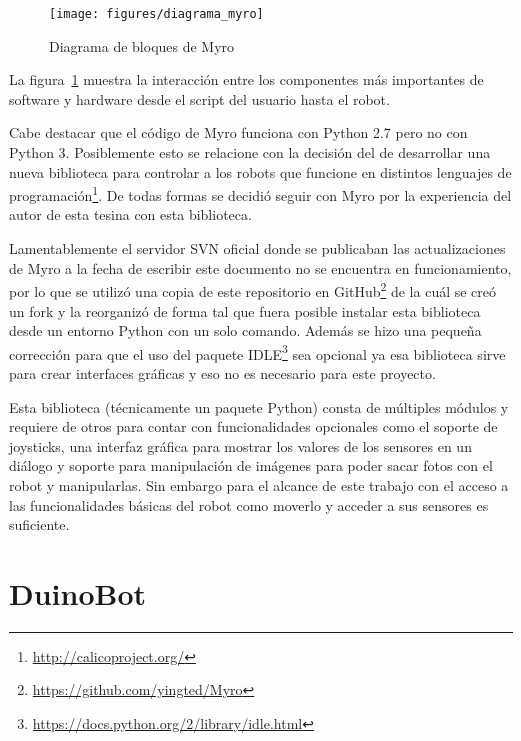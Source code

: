 \begin{figure}
    \centering
    \texttt{[image: figures/diagrama\_myro]}
    \caption{Diagrama de bloques de Myro}\label{fig:diagrama_myro}
\end{figure}

La figura~\ref{fig:diagrama_myro} muestra la interacción entre los componentes
más importantes de software y hardware desde el script del usuario hasta el
robot.

Cabe destacar que el código de Myro funciona con Python 2.7 pero no con
Python 3. Posiblemente esto se relacione con la decisión del \ipre{}
de desarrollar una nueva biblioteca para controlar a los robots que funcione
en distintos lenguajes de
programación\footnote{\url{http://calicoproject.org/}}. De todas formas se
decidió seguir con Myro por la experiencia del autor de esta tesina
con esta biblioteca.

Lamentablemente el servidor SVN oficial donde se publicaban las
actualizaciones de Myro a la fecha de escribir este documento
no se encuentra en funcionamiento, por lo que se utilizó una
copia de este repositorio en
GitHub\footnote{\url{https://github.com/yingted/Myro}} de la cuál
se creó un fork y la reorganizó de forma tal que fuera posible instalar
esta biblioteca desde un entorno Python con un solo comando.
Además se hizo
una pequeña corrección para que el uso del paquete
IDLE\footnote{\url{https://docs.python.org/2/library/idle.html}}
sea opcional ya esa biblioteca sirve para crear interfaces gráficas
y eso no es necesario para este proyecto.

Esta biblioteca (técnicamente un paquete Python) consta de múltiples
módulos y requiere de otros para contar con funcionalidades opcionales
como el soporte de joysticks, una interfaz gráfica para mostrar
los valores de los sensores en un diálogo y soporte para manipulación
de imágenes para poder sacar fotos con el robot y manipularlas. Sin
embargo para el alcance de este trabajo con el acceso a las funcionalidades
básicas del robot como moverlo y acceder a sus sensores es suficiente.


\section{DuinoBot}\label{sec:duinobot}

